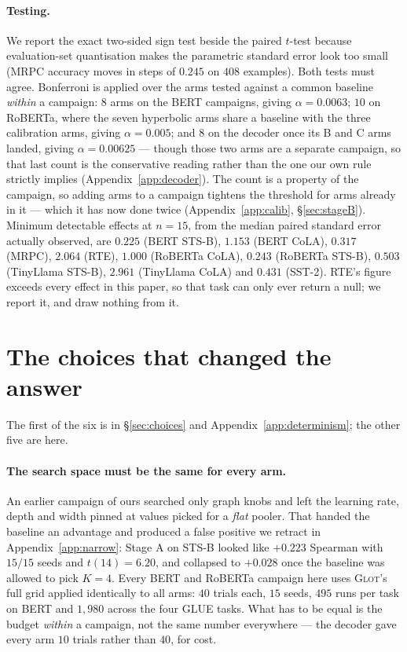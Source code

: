 \documentclass{article}
\begin{document}
\paragraph{Testing.} We report the exact two-sided sign test beside the paired
$t$-test because evaluation-set quantisation makes the parametric standard error
look too small (MRPC accuracy moves in steps of $0.245$ on $408$ examples). Both
tests must agree. Bonferroni is applied over the arms tested against a common
baseline \emph{within} a campaign: $8$ arms on the BERT campaigns, giving
$\alpha = 0.0063$; $10$ on RoBERTa, where the seven hyperbolic arms share a
baseline with the three calibration arms, giving $\alpha = 0.005$; and $8$ on
the decoder once its B and C arms landed, giving $\alpha = 0.00625$ --- though
those two arms are a separate campaign, so that last count is the conservative
reading rather than the one our own rule strictly implies
(Appendix~\ref{app:decoder}). The count
is a property of the campaign, so adding arms to a campaign tightens the
threshold for arms already in it --- which it has now done twice
(Appendix~\ref{app:calib}, \S\ref{sec:stageB}). Minimum detectable effects at
$n=15$, from the median paired standard error actually observed, are $0.225$
(BERT STS-B), $1.153$ (BERT CoLA), $0.317$ (MRPC), $2.064$ (RTE), $1.000$
(RoBERTa CoLA), $0.243$ (RoBERTa STS-B), $0.503$ (TinyLlama STS-B), $2.961$
(TinyLlama CoLA) and $0.431$ (SST-2). RTE's figure
exceeds every effect in this paper, so that task can only ever return a null; we
report it, and draw nothing from it.

\section{The choices that changed the answer}
\label{app:choices}

The first of the six is in \S\ref{sec:choices} and
Appendix~\ref{app:determinism}; the other five are here.

\paragraph{The search space must be the same for every arm.} An earlier
campaign of ours searched only graph knobs and left the learning rate, depth and
width pinned at values picked for a \emph{flat} pooler. That handed the baseline
an advantage and produced a false positive we retract in
Appendix~\ref{app:narrow}: Stage A on STS-B looked like $+0.223$ Spearman with
$15/15$ seeds and $t(14)=6.20$, and collapsed to $+0.028$ once the baseline was
allowed to pick $K=4$. Every BERT and RoBERTa campaign here uses \textsc{Glot}'s
full grid applied identically to all arms: $40$ trials each, $15$ seeds, $495$
runs per task on BERT and $1{,}980$ across the four GLUE tasks. What has to be
equal is the budget \emph{within} a campaign, not the same number everywhere ---
the decoder gave every arm $10$ trials rather than $40$, for cost.
\end{document}
